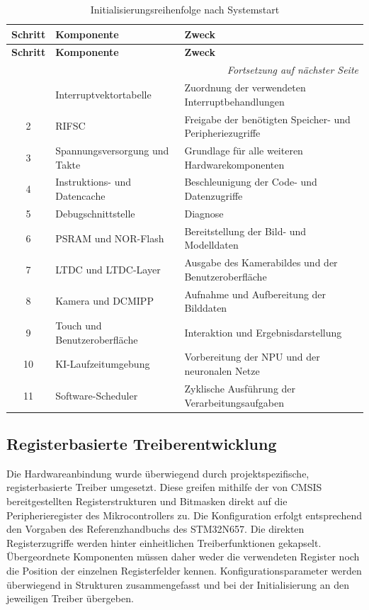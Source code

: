 \begin{longtable}{|c|p{}|p{}|}
    \caption{Initialisierungsreihenfolge nach Systemstart}
    \label{tab:init-reihenfolge} \\
    \hline
    \textbf{Schritt} & \textbf{Komponente} & \textbf{Zweck} \\
    \hline
    \endfirsthead
    \hline
    \textbf{Schritt} & \textbf{Komponente} & \textbf{Zweck} \\
    \hline
    \endhead
    \hline
    \multicolumn{3}{r}{\textit{Fortsetzung auf nächster Seite}} \\
    \endfoot
    \hline
    \endlastfoot
    1  & Interruptvektortabelle      & Zuordnung der verwendeten Interruptbehandlungen \\
    \hline
    2  & RIFSC                       & Freigabe der benötigten Speicher- und Peripheriezugriffe \\
    \hline
    3  & Spannungsversorgung und Takte & Grundlage für alle weiteren Hardwarekomponenten \\
    \hline
    4  & Instruktions- und Datencache & Beschleunigung der Code- und Datenzugriffe \\
    \hline
    5  & Debugschnittstelle          & Diagnose \\
    \hline
    6  & PSRAM und NOR-Flash         & Bereitstellung der Bild- und Modelldaten \\
    \hline
    7  & LTDC und LTDC-Layer         & Ausgabe des Kamerabildes und der Benutzeroberfläche \\
    \hline
    8  & Kamera und DCMIPP           & Aufnahme und Aufbereitung der Bilddaten \\
    \hline
    9  & Touch und Benutzeroberfläche & Interaktion und Ergebnisdarstellung \\
    \hline
    10 & KI-Laufzeitumgebung         & Vorbereitung der NPU und der neuronalen Netze \\
    \hline
    11 & Software-Scheduler          & Zyklische Ausführung der Verarbeitungsaufgaben \\
    \hline
\end{longtable}

\subsection{Registerbasierte Treiberentwicklung}

Die Hardwareanbindung wurde überwiegend durch projektspezifische, registerbasierte Treiber umgesetzt. Diese greifen mithilfe der von CMSIS bereitgestellten Registerstrukturen und Bitmasken direkt auf die Peripherieregister des Mikrocontrollers zu. Die Konfiguration erfolgt entsprechend den Vorgaben des Referenzhandbuchs des STM32N657. Die direkten Registerzugriffe werden hinter einheitlichen Treiberfunktionen gekapselt. Übergeordnete Komponenten müssen daher weder die verwendeten Register noch die Position der einzelnen Registerfelder kennen. Konfigurationsparameter werden überwiegend in Strukturen zusammengefasst und bei der Initialisierung an den jeweiligen Treiber übergeben.

